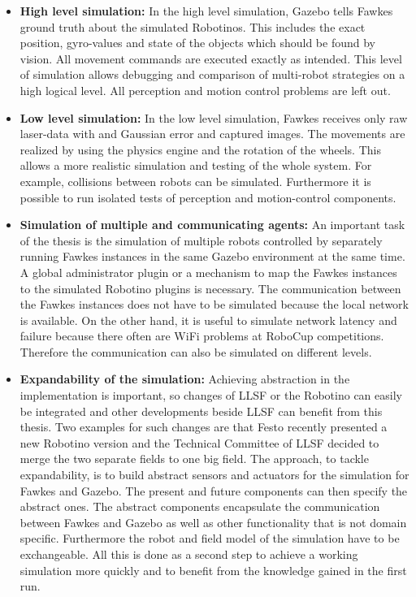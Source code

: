 \documentclass[a4paper,11pt,hidelinks]{article}
\begin{document}
\begin{itemize}
\item \textbf{High level simulation:} In the high level simulation, Gazebo tells Fawkes ground truth about the simulated Robotinos. This includes the exact position, gyro-values and state of the objects which should be found by vision. All movement commands are executed exactly as intended. This level of simulation allows debugging and comparison of multi-robot strategies on a high logical level. All perception and motion control problems are left out.
\item \textbf{Low level simulation:} In the low level simulation, Fawkes receives only raw laser-data with and Gaussian error and captured images. The movements are realized by using the physics engine and the rotation of the wheels. This allows a more realistic simulation and testing of the whole system. For example, collisions between robots can be simulated. Furthermore it is possible to run isolated tests of perception and motion-control components.
\item \textbf{Simulation of multiple and communicating agents:} An important task of the thesis is the simulation of multiple robots controlled by separately running Fawkes instances in the same Gazebo environment at the same time. A global administrator plugin or a mechanism to map the Fawkes instances to the simulated Robotino plugins is necessary. The communication between the Fawkes instances does not have to be simulated because the local network is available. On the other hand, it is useful to simulate network latency and failure because there often are WiFi problems at RoboCup competitions. Therefore the communication can also be simulated on different levels.\\
\item \textbf{Expandability of the simulation:} Achieving abstraction in the implementation is important, so changes of LLSF or the Robotino can easily be integrated and other developments beside LLSF can benefit from this thesis. Two examples for such changes are that Festo recently presented a new Robotino version and the Technical Committee of LLSF decided to merge the two separate fields to one big field. The approach, to tackle expandability, is to build abstract sensors and actuators for the simulation for Fawkes and Gazebo. The present and future components can then specify the abstract ones. The abstract components encapsulate the communication between Fawkes and Gazebo as well as other functionality that is not domain specific. Furthermore the robot and field model of the simulation have to be exchangeable. All this is done as a second step to achieve a working simulation more quickly and to benefit from the knowledge gained in the first run.

\end{itemize}
\end{document}
